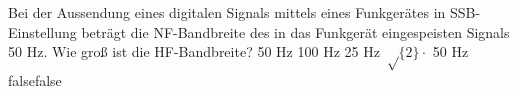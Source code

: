     {Bei der Aussendung eines digitalen Signals mittels eines Funkgerätes in SSB-Einstellung beträgt die NF-Bandbreite des in das Funkgerät eingespeisten Signals 50 Hz. Wie groß ist die HF-Bandbreite?}
    {50 Hz}
    {100 Hz}
    {25 Hz}
    {$\sqrt\{2\} \cdot$ 50 Hz}
    {false}{false}